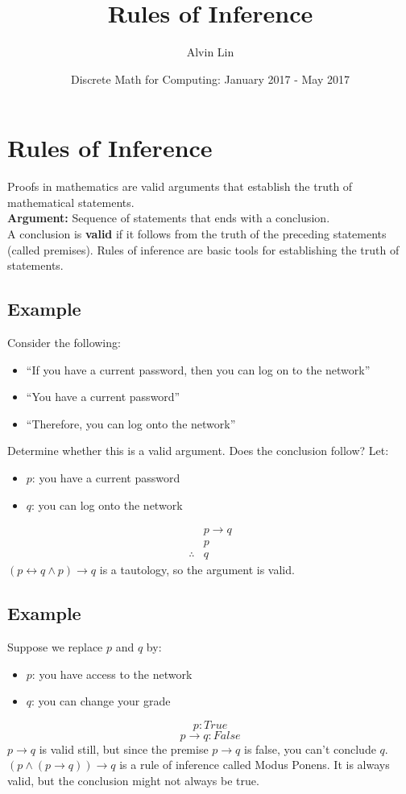 \documentclass[letterpaper, 12pt]{math}
\title{Rules of Inference}
\author{Alvin Lin}
\date{Discrete Math for Computing: January 2017 - May 2017}
\begin{document}
\maketitle

\section*{Rules of Inference}
Proofs in mathematics are valid arguments that establish the truth of
mathematical statements. \\
\textbf{Argument:} Sequence of statements that ends with a conclusion. \\
A conclusion is \textbf{valid} if it follows from the truth of the preceding
statements (called premises). Rules of inference are basic tools for
establishing the truth of statements.

\subsection*{Example}
Consider the following:
\begin{itemize}
  \item ``If you have a current password, then you can log on to the network''
  \item ``You have a current password''
  \item ``Therefore, you can log onto the network''
\end{itemize}
Determine whether this is a valid argument. Does the conclusion follow? Let:
\begin{itemize}
  \item \( p \): you have a current password
  \item \( q \): you can log onto the network
\end{itemize}
\begin{align*}
  & p \to q \\
  & p \\
  \therefore & q
\end{align*}
\( (p \leftrightarrow q \wedge p) \to q \) is a tautology, so the argument is
valid.

\subsection*{Example}
Suppose we replace \( p \) and \( q \) by:
\begin{itemize}
  \item \( p \): you have access to the network
  \item \( q \): you can change your grade
\end{itemize}
\[ p: True \]
\[ p \to q: False \]
\( p \to q \) is valid still, but since the premise \( p \to q \) is false, you
can't conclude \( q \). \( (p \wedge (p \to q)) \to q \) is a rule of inference
called Modus Ponens. It is always valid, but the conclusion might not always be
true.
\end{document}
